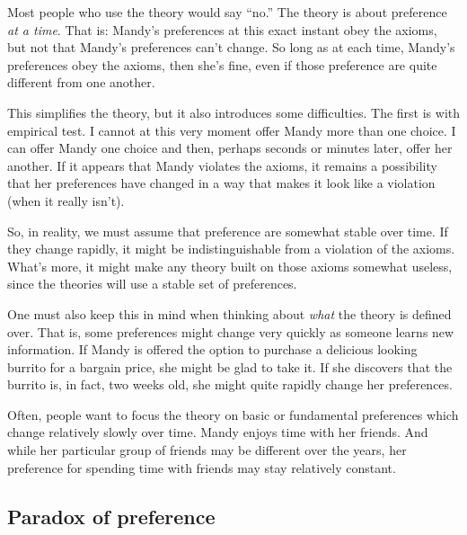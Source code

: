 Most people who use the theory would say ``no.''  The theory is about preference {\it at a time}. That is: Mandy's preferences at this exact instant obey the axioms, but not that Mandy's preferences can't change.  So long as at each time, Mandy's preferences obey the axioms, then she's fine, even if those preference are quite different from one another.

This simplifies the theory, but it also introduces some difficulties.  The first is with empirical test.  I cannot at this very moment offer Mandy more than one choice. I can offer Mandy one choice and then, perhaps seconds or minutes later, offer her another.  If it appears that Mandy violates the axioms, it remains a possibility that her preferences have changed in a way that makes it look like a violation (when it really isn't).

So, in reality, we must assume that preference are somewhat stable over time.  If they change rapidly, it might be indistinguishable from a violation of the axioms.  What's more, it might make any theory built on those axioms somewhat useless, since the theories will use a stable set of preferences.

One must also keep this in mind when thinking about {\it what} the theory is defined over.  That is, some preferences might change very quickly as someone learns new information.  If Mandy is offered the option to purchase a delicious looking burrito for a bargain price, she might be glad to take it.  If she discovers that the burrito is, in fact, two weeks old, she might quite rapidly change her preferences.

Often, people want to focus the theory on basic or fundamental preferences which change relatively slowly over time.  Mandy enjoys time with her friends.  And while her particular group of friends may be different over the years, her preference for spending time with friends may stay relatively constant.

\subsection{Paradox of preference}

